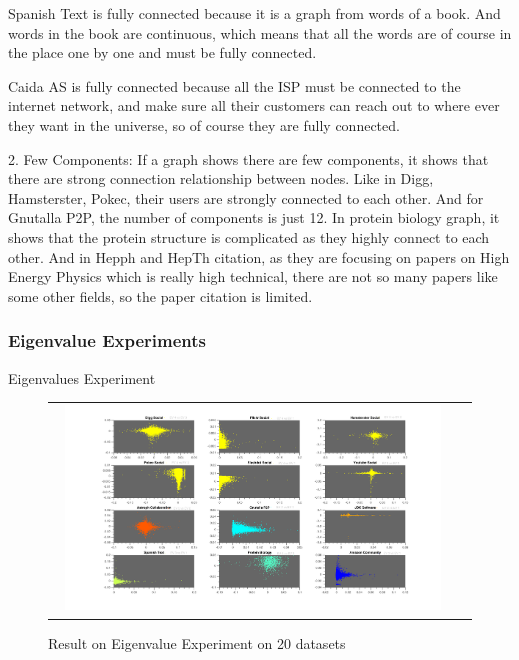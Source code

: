 Spanish Text is fully connected because it is a graph from words of a book. And words in the book are continuous, which means that all the words are of course in the place one by one and must be fully connected.

Caida AS is fully connected because all the ISP must be connected to the internet network, and make sure all their customers can reach out to where ever they want in the universe, so of course they are fully connected.

2. Few Components:
If a graph shows there are few components, it shows that there are strong connection relationship between nodes. Like in Digg, Hamsterster, Pokec, their users are strongly connected to each other. And for Gnutalla P2P, the number of components is just 12. In protein biology graph, it shows that the protein structure is complicated as they highly connect to each other. And in Hepph and HepTh citation, as they are focusing on papers on High Energy Physics which is really high technical, there are not so many papers like some other fields, so the paper citation is limited.

\subsubsection{Eigenvalue Experiments}
Eigenvalues Experiment

\begin{figure}[H]
\begin{center}
\begin{tabular}{cc}
     \includegraphics[width=0.95\textwidth]{FIG/eigenv1.png}
\end{tabular}
\caption{Result on Eigenvalue Experiment on 20 datasets}
\end{center}
\end{figure}

